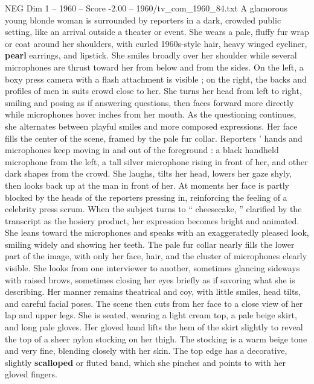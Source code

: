 \begin{textsample}{NEG Dim 1 – 1960 – Score -2.00 – 1960/tv\_com\_1960\_84.txt}  \label{ex:f1_neg_029}
A glamorous young blonde woman is surrounded by reporters in a dark, crowded public setting, like an arrival outside a theater or event.
She wears a pale, fluffy fur wrap or coat around her shoulders, with curled 1960s-style hair, heavy winged eyeliner, \textbf{pearl} earrings, and lipstick.
She smiles broadly over her shoulder while several microphones are thrust toward her from below and from the sides.
On the left, a boxy press camera with a flash attachment is visible ; on the right, the backs and profiles of men in suits crowd close to her.
She turns her head from left to right, smiling and posing as if answering questions, then faces forward more directly while microphones hover inches from her mouth.
As the questioning continues, she alternates between playful smiles and more composed expressions.
Her face fills the center of the scene, framed by the pale fur collar.
Reporters ’ hands and microphones keep moving in and out of the foreground : a black handheld microphone from the left, a tall silver microphone rising in front of her, and other dark shapes from the crowd.
She laughs, tilts her head, lowers her gaze shyly, then looks back up at the man in front of her.
At moments her face is partly blocked by the heads of the reporters pressing in, reinforcing the feeling of a celebrity press scrum.
When the subject turns to “ cheesecake, ” clarified by the transcript as the hosiery product, her expression becomes bright and animated.
She leans toward the microphones and speaks with an exaggeratedly pleased look, smiling widely and showing her teeth.
The pale fur collar nearly fills the lower part of the image, with only her face, hair, and the cluster of microphones clearly visible.
She looks from one interviewer to another, sometimes glancing sideways with raised brows, sometimes closing her eyes briefly as if savoring what she is describing.
Her manner remains theatrical and coy, with little smiles, head tilts, and careful facial poses.
The scene then cuts from her face to a close view of her lap and upper legs.
She is seated, wearing a light cream top, a pale beige skirt, and long pale gloves.
Her gloved hand lifts the hem of the skirt slightly to reveal the top of a sheer nylon stocking on her thigh.
The stocking is a warm beige tone and very fine, blending closely with her skin.
The top edge has a decorative, slightly \textbf{scalloped} or fluted band, which she pinches and points to with her gloved fingers.

\end{textsample}
